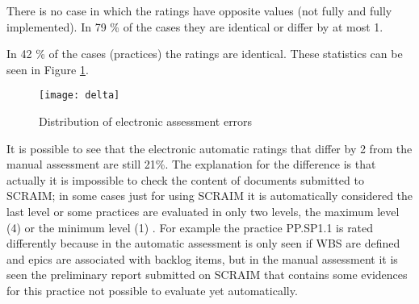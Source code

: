 There is no case in which the ratings have opposite values (not fully and fully implemented). In 79 \% of the cases they are identical or differ by at most 1.

In 42 \% of the cases (practices) the ratings are identical. These statistics can be seen in Figure \ref{fig:errorresults}.

\begin{figure}[H]
	\begin{center}
		\leavevmode
		\texttt{[image: delta]}
		\caption{Distribution of electronic assessment errors}
		\label{fig:errorresults}
	\end{center}
\end{figure}

It is possible to see that the electronic automatic ratings that differ by 2 from the manual assessment are still 21\%. The explanation for the difference is that actually it is impossible to check the content of documents submitted to SCRAIM; in some cases just for using SCRAIM it is automatically considered the last level or some practices are evaluated in only two levels, the maximum level (4)  or the minimum level (1) . For example the practice PP.SP1.1 is rated differently because in the automatic assessment is only seen if WBS are defined and epics are associated with backlog items, but in the manual assessment it is seen the preliminary report submitted on SCRAIM that contains some evidences for this practice not possible to evaluate yet automatically.

%
